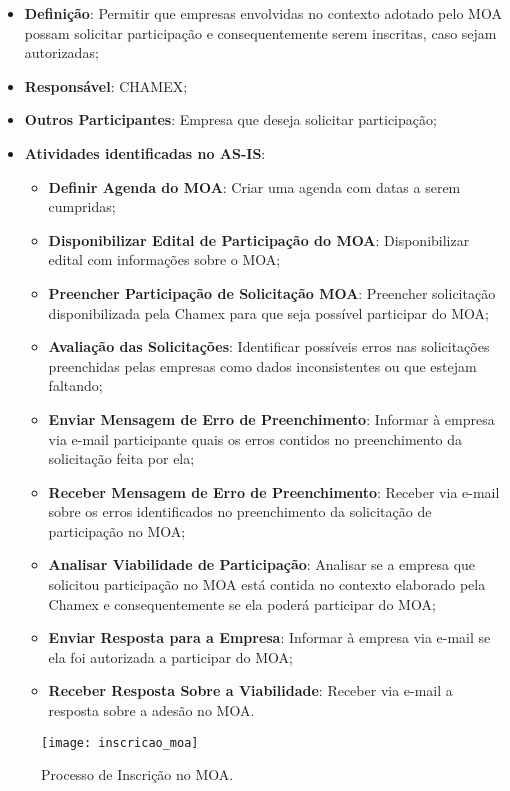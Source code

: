 \begin{itemize}
	\item{\textbf{Definição}: Permitir que empresas envolvidas no contexto adotado pelo MOA possam solicitar participação e consequentemente serem inscritas, caso sejam autorizadas;}
	\item{\textbf{Responsável}: CHAMEX;}
	\item{\textbf{Outros Participantes}: Empresa que deseja solicitar participação;}
	\item{\textbf{Atividades identificadas no AS-IS}:
		\begin{itemize}
			\item{\textbf{Definir Agenda do MOA}: Criar uma agenda com datas a serem cumpridas;}
			\item{\textbf{Disponibilizar Edital de Participação do MOA}: Disponibilizar edital com informações sobre o MOA;}
			\item{\textbf{Preencher Participação de Solicitação MOA}: Preencher solicitação disponibilizada pela Chamex para que seja possível participar do MOA;}
			\item{\textbf{Avaliação das Solicitações}: Identificar possíveis erros nas solicitações preenchidas pelas empresas como dados inconsistentes ou que estejam faltando;}
			\item{\textbf{Enviar Mensagem de Erro de Preenchimento}: Informar à empresa via e-mail participante quais os erros contidos no preenchimento da solicitação feita por ela;}
			\item{\textbf{Receber Mensagem de Erro de Preenchimento}: Receber via e-mail sobre os erros identificados no preenchimento da solicitação de participação no MOA;}
			\item{\textbf{Analisar Viabilidade de Participação}: Analisar se a empresa que solicitou participação no MOA está contida no contexto elaborado pela Chamex e consequentemente se ela poderá participar do MOA;}
			\item{\textbf{Enviar Resposta para a Empresa}: Informar à empresa via e-mail se ela foi autorizada a participar do MOA;}
			\item{\textbf{Receber Resposta Sobre a Viabilidade}: Receber via e-mail a resposta sobre a adesão no MOA.}
		\end{itemize}}
\end{itemize}
\begin{landscape}
	\vspace*{\fill}
	\begin{figure}[H]
		\centering
		\texttt{[image: inscricao\_moa]}
		\caption[Processo de Inscrição no MOA]{Processo de Inscrição no MOA.}
		\label{fig:processo_inscricao}
	\end{figure}
	\vspace*{\fill}
\end{landscape}